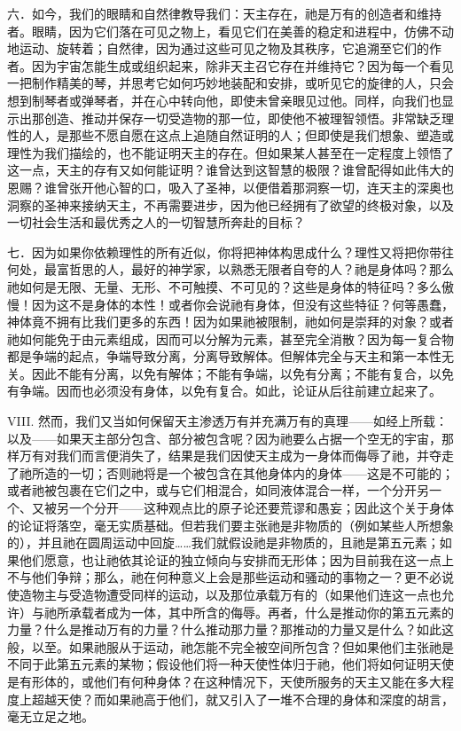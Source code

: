 六．如今，我们的眼睛和自然律教导我们：天主存在，祂是万有的创造者和维持者。眼睛，因为它们落在可见之物上，看见它们在美善的稳定和进程中，仿佛不动地运动、旋转着；自然律，因为通过这些可见之物及其秩序，它追溯至它们的作者。因为宇宙怎能生成或组织起来，除非天主召它存在并维持它？因为每一个看见一把制作精美的琴，并思考它如何巧妙地装配和安排，或听见它的旋律的人，只会想到制琴者或弹琴者，并在心中转向他，即使未曾亲眼见过他。同样，向我们也显示出那创造、推动并保存一切受造物的那一位，即使他不被理智领悟。非常缺乏理性的人，是那些不愿自愿在这点上追随自然证明的人；但即使是我们想象、塑造或理性为我们描绘的，也不能证明天主的存在。但如果某人甚至在一定程度上领悟了这一点，天主的存有又如何能证明？谁曾达到这智慧的极限？谁曾配得如此伟大的恩赐？谁曾张开他心智的口，吸入了圣神，以便借着那洞察一切，连天主的深奥也洞察的圣神来接纳天主，不再需要进步，因为他已经拥有了欲望的终极对象，以及一切社会生活和最优秀之人的一切智慧所奔赴的目标？\par

七．因为如果你依赖理性的所有近似，你将把神体构思成什么？理性又将把你带往何处，最富哲思的人，最好的神学家，以熟悉无限者自夸的人？祂是身体吗？那么祂如何是无限、无量、无形、不可触摸、不可见的？这些是身体的特征吗？多么傲慢！因为这不是身体的本性！或者你会说祂有身体，但没有这些特征？何等愚蠢，神体竟不拥有比我们更多的东西！因为如果祂被限制，祂如何是崇拜的对象？或者祂如何能免于由元素组成，因而可以分解为元素，甚至完全消散？因为每一复合物都是争端的起点，争端导致分离，分离导致解体。但解体完全与天主和第一本性无关。因此不能有分离，以免有解体；不能有争端，以免有分离；不能有复合，以免有争端。因而也必须没有身体，以免有复合。如此，论证从后往前建立起来了。\par

VIII. 然而，我们又当如何保留天主渗透万有并充满万有的真理——如经上所载：以及——如果天主部分包含、部分被包含呢？因为祂要么占据一个空无的宇宙，那样万有对我们而言便消失了，结果是我们因使天主成为一身体而侮辱了祂，并夺走了祂所造的一切；否则祂将是一个被包含在其他身体内的身体——这是不可能的；或者祂被包裹在它们之中，或与它们相混合，如同液体混合一样，一个分开另一个、又被另一个分开——这种观点比的原子论还要荒谬和愚妄；因此这个关于身体的论证将落空，毫无实质基础。但若我们要主张祂是非物质的（例如某些人所想象的），并且祂在圆周运动中回旋……我们就假设祂是非物质的，且祂是第五元素；如果他们愿意，也让祂依其论证的独立倾向与安排而无形体；因为目前我在这一点上不与他们争辩；那么，祂在何种意义上会是那些运动和骚动的事物之一？更不必说使造物主与受造物遭受同样的运动，以及那位承载万有的（如果他们连这一点也允许）与祂所承载者成为一体，其中所含的侮辱。再者，什么是推动你的第五元素的力量？什么是推动万有的力量？什么推动那力量？那推动的力量又是什么？如此这般，以至。如果祂服从于运动，祂怎能不完全被空间所包含？但如果他们主张祂是不同于此第五元素的某物；假设他们将一种天使性体归于祂，他们将如何证明天使是有形体的，或他们有何种身体？在这种情况下，天使所服务的天主又能在多大程度上超越天使？而如果祂高于他们，就又引入了一堆不合理的身体和深度的胡言，毫无立足之地。\par

